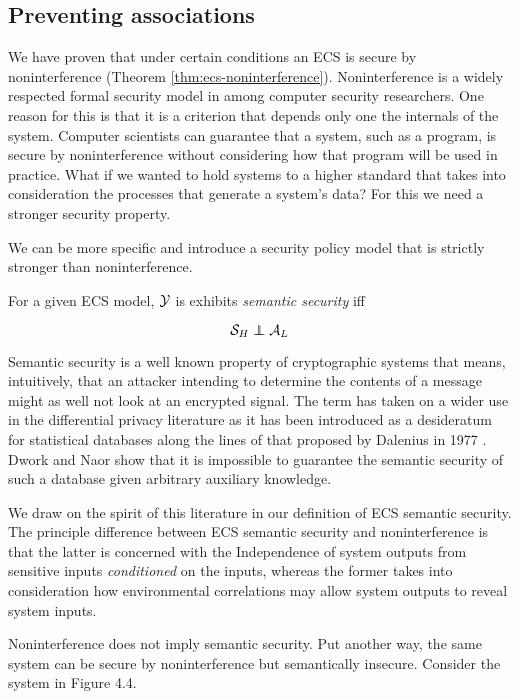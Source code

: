 \documentclass[../thesis.tex]{subfiles}
\begin{document}
\subsection{Preventing associations}
\label{sec:prevention}

We have proven that under certain conditions
an ECS is secure by noninterference
(Theorem \ref{thm:ecs-noninterference}).
Noninterference is a widely respected formal
security model in among computer security
researchers.
One reason for this is that it is a criterion
that depends only one the internals of the
system.
Computer scientists can guarantee that a system,
such as a program, is secure by noninterference
without considering how that program will be used
in practice.
What if we wanted to hold systems to a higher standard
that takes into consideration the processes that generate
a system's data?
For this we need a stronger security property.

We can be more specific and introduce a security policy model
that is strictly stronger than noninterference.

\begin{dfn} %
  For a given ECS model, $\mathcal{Y}$ is
  exhibits \emph{semantic security} iff

  $$ \mc{S}_H \independent \A_L $$
\end{dfn}

Semantic security is a well known property of
cryptographic systems that means, intuitively,
that an attacker intending to determine the
contents of a message might as well not look at
an encrypted signal.
The term has taken on a wider use in the differential
privacy literature as it has been introduced
as a desideratum for statistical
databases along the lines of that proposed
by Dalenius in 1977 \cite{dalenius77statistik, dwork06icalp}. 
Dwork and Naor \cite{dwork06icalp,dwork08jpc} show that it is impossible to
guarantee the semantic security of such a database
given arbitrary auxiliary knowledge.

We draw on the spirit of this literature in our
definition of ECS semantic security.
The principle difference between ECS semantic
security and noninterference is that the
latter is concerned with the Independence of
system outputs from sensitive inputs
\emph{conditioned} on the inputs,
whereas the former takes into consideration
how environmental correlations may allow
system outputs to reveal system inputs.

Noninterference does not imply semantic security.
Put another way, the same system can be secure by
noninterference but semantically insecure.
Consider the system in Figure 4.4.
\end{document}

